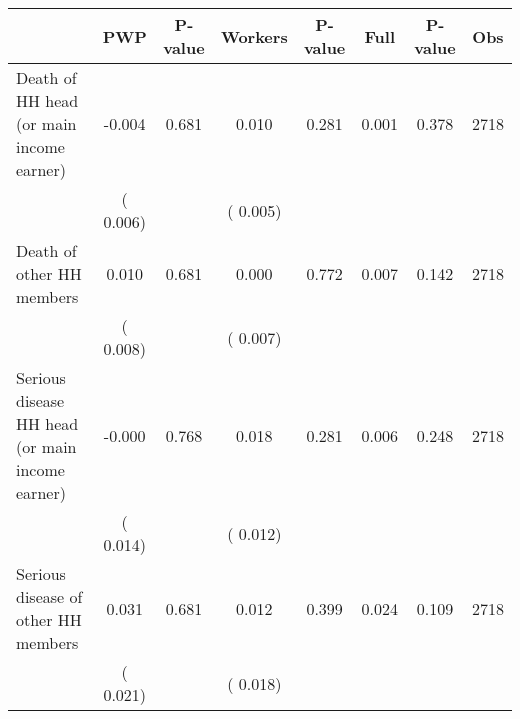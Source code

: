 
\begin{tabular}{l*{7}{c}}\hline&\multicolumn{1}{c}{PWP}&\multicolumn{1}{c}{P-value}&\multicolumn{1}{c}{Workers}&\multicolumn{1}{c}{P-value}&\multicolumn{1}{c}{Full}&\multicolumn{1}{c}{P-value}&\multicolumn{1}{c}{Obs} \\ \hline

 Death of HH head (or main income earner)       &             -0.004       &        0.681  &              0.010       &        0.281  &              0.001       &              0.378 &  2718 \\ 
                       &       (       0.006)             &                               &       (       0.005)                     &                               &                                               &                                &                      \\ 

 Death of other HH members       &              0.010       &        0.681  &              0.000       &        0.772  &              0.007       &              0.142 &  2718 \\ 
                       &       (       0.008)             &                               &       (       0.007)                     &                               &                                               &                                &                      \\ 

 Serious disease HH head (or main income earner)       &             -0.000       &        0.768  &              0.018       &        0.281  &              0.006       &              0.248 &  2718 \\ 
                       &       (       0.014)             &                               &       (       0.012)                     &                               &                                               &                                &                      \\ 

 Serious disease of other HH members       &              0.031       &        0.681  &              0.012       &        0.399  &              0.024       &              0.109 &  2718 \\ 
                       &       (       0.021)             &                               &       (       0.018)                     &                               &                                               &                                &                      \\ 


\end{tabular}
